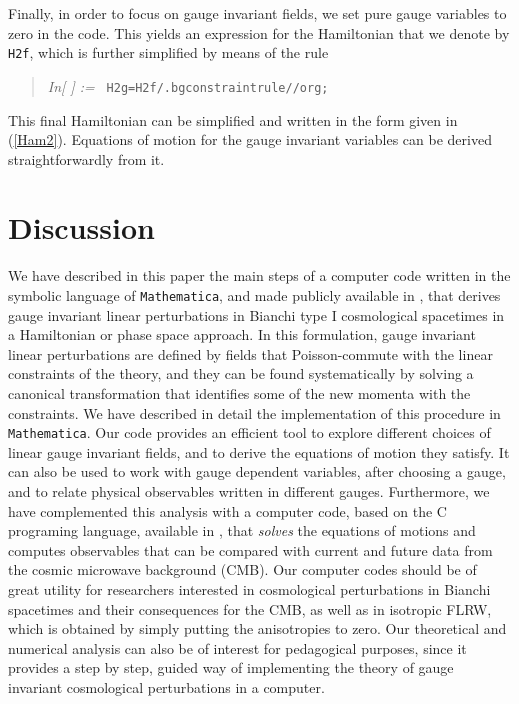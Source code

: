 \documentclass[11pt,tightenlines,eqsecnum,floats,aps,amsmath,amssymb,nofootinbib,prd,floatfix]{revtex4}
\newcommand{\<}{\langle}
\renewcommand{\>}{\rangle}
\newcounter{inout}
\newcommand{\inoutput}{%
	\stepcounter{inout}%
	\theinout}
\newcommand{\mathIn}[1]{
	\begin{quotation}\hspace*{-2.5cm} {\em In[\inoutput] :=\ } {\tt #1} \end{quotation}}
\begin{document}
Finally, in order to focus on gauge invariant fields, we set pure gauge variables to zero in the code. This yields an expression for the Hamiltonian that we denote by {\tt H2f}, which is further simplified by means of the rule
%
\mathIn{H2g=H2f/.bgconstraintrule//org;}
%
This final Hamiltonian can  be simplified and written in the form  given in (\ref{Ham2}). Equations of motion for the gauge invariant variables can be derived straightforwardly from it. 


\section{Discussion}\label{sec:concl}

We have described in this paper the main steps of a computer code written in the symbolic language of {\tt Mathematica}, and made publicly available in \cite{ntbk}, that derives gauge invariant linear perturbations in Bianchi type I cosmological spacetimes in a Hamiltonian or phase space approach. In this formulation, gauge invariant linear perturbations are defined by  fields that Poisson-commute with the linear constraints of the theory, and they can be found systematically by solving a canonical transformation that identifies some of the new momenta with the constraints. We have described in detail the implementation of this procedure in {\tt Mathematica}. Our code provides an efficient tool to explore different choices of linear gauge invariant fields, and to derive the equations of motion they satisfy. It can also be used to work with gauge dependent variables, after choosing a gauge, and to relate physical observables written in different gauges.
Furthermore, we have complemented this analysis with a computer code, based on the C programing language, available in  \cite{num-lib}, that {\em solves} the equations of motions and computes observables that can be compared with current and future data from the cosmic microwave background (CMB). Our computer codes should be of great utility for researchers interested in cosmological perturbations in Bianchi spacetimes and their consequences for the CMB, as well as in isotropic FLRW, which is obtained by simply putting the anisotropies to zero. Our theoretical and numerical analysis can also  be of interest for pedagogical purposes, since it provides a step by step, guided way of implementing  the theory of gauge invariant cosmological perturbations in a computer. 
\end{document}
